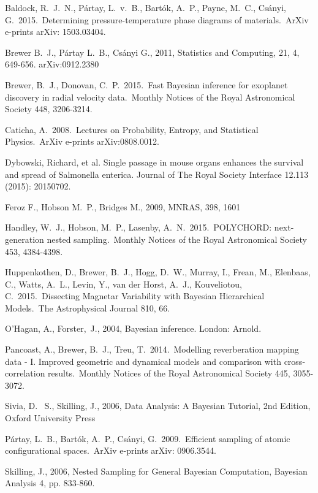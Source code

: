 \documentclass[article]{jss}
\begin{document}
\begin{thebibliography}{99}
 Baldock, R.~J.~N., 
P{\'a}rtay, L.~v.~B., Bart{\'o}k, A.~P., Payne, M.~C., Cs{\'a}nyi, G.\ 
2015.\ Determining pressure-temperature phase diagrams of materials.\ ArXiv 
e-prints arXiv: 1503.03404. 

 Brewer B.~J., P{\'a}rtay L.~B., Cs{\'a}nyi G., 2011,
Statistics and Computing, 21, 4, 649-656. arXiv:0912.2380

 Brewer, B.~J., Donovan, C.~P.\ 2015.\ Fast Bayesian inference for exoplanet discovery in radial velocity data.\ Monthly Notices of the Royal Astronomical Society 448, 3206-3214. 

 Caticha, A.\ 2008.\ Lectures 
on Probability, Entropy, and Statistical Physics.\ ArXiv e-prints 
arXiv:0808.0012.

Dybowski, Richard, et al. Single passage in mouse organs enhances the survival and spread of Salmonella enterica. Journal of The Royal Society Interface 12.113 (2015): 20150702.

 Feroz F., Hobson M.~P., Bridges M., 2009, MNRAS, 398, 1601

 Handley, W.~J., Hobson, M.~P., Lasenby, A.~N.\ 2015.\ POLYCHORD: next-generation nested sampling.\ Monthly Notices of the Royal Astronomical Society 453, 4384-4398. 

 Huppenkothen, D., Brewer, B.~J., Hogg, D.~W., Murray, I., Frean, M., Elenbaas, C., Watts, A.~L., Levin, Y., van der Horst, A.~J., Kouveliotou, C.\ 2015.\ Dissecting Magnetar Variability with Bayesian Hierarchical Models.\ The Astrophysical Journal 810, 66. 

O'Hagan, A., Forster,~J., 2004, Bayesian inference. London: Arnold.

 Pancoast, A., Brewer, B.~J., Treu, T.\ 2014.\ Modelling reverberation mapping data - I. Improved geometric and dynamical models and comparison with cross-correlation results.\ Monthly Notices of the Royal Astronomical Society 445, 3055-3072.

 Sivia, 
D.~ S., Skilling, J., 2006, Data Analysis: A Bayesian Tutorial, 2nd 
Edition, Oxford University Press

 P{\'a}rtay, L.~B., 
Bart{\'o}k, A.~P., Cs{\'a}nyi, G.\ 2009.\ Efficient sampling of atomic 
configurational spaces.\ ArXiv e-prints arXiv: 0906.3544. 

 Skilling, J., 2006, Nested Sampling for General Bayesian Computation, Bayesian Analysis 4, pp. 833-860.

\end{thebibliography}
\end{document}
